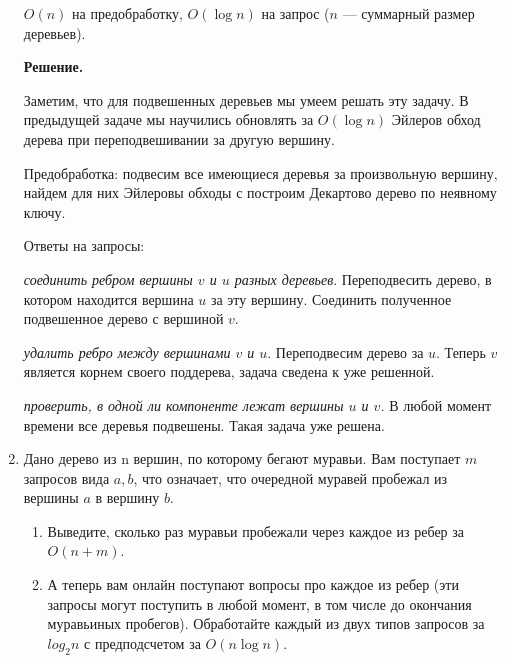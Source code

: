 \begin{enumerate}
	$O(n)$ на предобработку, $O(\log n)$ на запрос ($n$ — суммарный размер деревьев).
	
	\textbf{Решение.} 
	
	Заметим, что для подвешенных деревьев мы умеем решать эту задачу. В предыдущей задаче мы 
	научились обновлять за $O(\log n)$ Эйлеров обход дерева при переподвешивании за другую 
	вершину.
	
	Предобработка: подвесим все имеющиеся деревья за произвольную вершину, найдем для них 
	Эйлеровы обходы  с построим Декартово дерево по неявному ключу. 
	
	Ответы на запросы:
	
	\textit{соединить ребром вершины $v$ и $u$ разных деревьев}. Переподвесить дерево, в 
	котором находится вершина $u$ за эту вершину. Соединить полученное подвешенное дерево с 
	вершиной $v$.
	
	\textit{удалить ребро между вершинами $v$ и $u$}. Переподвесим дерево за $u$. Теперь $v$ 
	является корнем своего поддерева, задача сведена к уже решенной.
	
	\textit{проверить, в одной ли компоненте лежат вершины $u$ и $v$.} В любой момент времени 
	все деревья подвешены. Такая задача уже решена.
	
	
	
	\item Дано дерево из n вершин, по которому бегают муравьи. Вам поступает $m$
	запросов вида $a, b$, что означает, что очередной муравей пробежал из вершины $a$ в вершину 
	$b$.
	
	\begin{enumerate}
		\item Выведите, сколько раз муравьи пробежали через каждое из ребер за $O(n + m)$.
		\item А теперь вам онлайн поступают вопросы про каждое из ребер (эти запросы могут поступить в любой момент, в том числе до окончания муравьиных пробегов). Обработайте каждый из двух типов запросов за $log_2 n$ с предподсчетом за $O(n \log n)$.
	\end{enumerate}
\end{enumerate}


